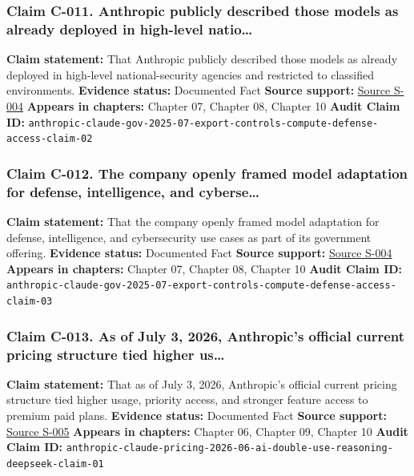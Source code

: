 \documentclass[
  american,
  11pt,
  letterpaper,
]{article}
\begin{document}
\subsubsection{Claim C-011. Anthropic publicly described those models as
already deployed in high-level
natio\ldots{}}\label{claim-c-011-anthropic-publicly-described-those-models-as-already-deployed-in-high-level-natio}

\textbf{Claim statement:} That Anthropic publicly described those models
as already deployed in high-level national-security agencies and
restricted to classified environments. \textbf{Evidence status:}
Documented Fact \textbf{Source support:}
\hyperref[source-s-004-claude-gov-models-for-u-s-national-security-customers]{Source
S-004} \textbf{Appears in chapters:} Chapter 07, Chapter 08, Chapter 10
\textbf{Audit Claim ID:}
\texttt{anthropic-claude-gov-2025-07-export-controls-compute-defense-access-claim-02}

\subsubsection{Claim C-012. The company openly framed model adaptation
for defense, intelligence, and
cyberse\ldots{}}\label{claim-c-012-the-company-openly-framed-model-adaptation-for-defense-intelligence-and-cyberse}

\textbf{Claim statement:} That the company openly framed model
adaptation for defense, intelligence, and cybersecurity use cases as
part of its government offering. \textbf{Evidence status:} Documented
Fact \textbf{Source support:}
\hyperref[source-s-004-claude-gov-models-for-u-s-national-security-customers]{Source
S-004} \textbf{Appears in chapters:} Chapter 07, Chapter 08, Chapter 10
\textbf{Audit Claim ID:}
\texttt{anthropic-claude-gov-2025-07-export-controls-compute-defense-access-claim-03}

\subsubsection{Claim C-013. As of July 3, 2026, Anthropic's official
current pricing structure tied higher
us\ldots{}}\label{claim-c-013-as-of-july-3-2026-anthropic-s-official-current-pricing-structure-tied-higher-us}

\textbf{Claim statement:} That as of July 3, 2026, Anthropic's official
current pricing structure tied higher usage, priority access, and
stronger feature access to premium paid plans. \textbf{Evidence status:}
Documented Fact \textbf{Source support:}
\hyperref[source-s-005-plans-pricing-claude-by-anthropic]{Source S-005}
\textbf{Appears in chapters:} Chapter 06, Chapter 09, Chapter 10
\textbf{Audit Claim ID:}
\texttt{anthropic-claude-pricing-2026-06-ai-double-use-reasoning-deepseek-claim-01}
\end{document}

